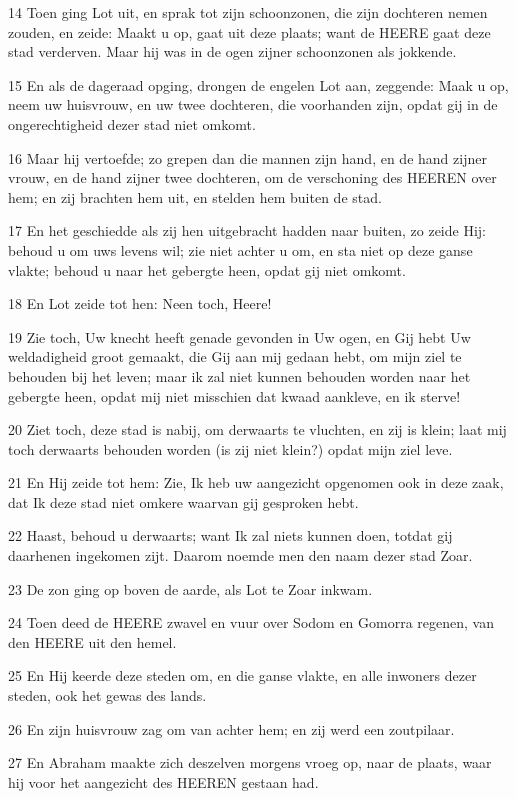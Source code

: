 \par 14 Toen ging Lot uit, en sprak tot zijn schoonzonen, die zijn dochteren nemen zouden, en zeide: Maakt u op, gaat uit deze plaats; want de HEERE gaat deze stad verderven. Maar hij was in de ogen zijner schoonzonen als jokkende.
\par 15 En als de dageraad opging, drongen de engelen Lot aan, zeggende: Maak u op, neem uw huisvrouw, en uw twee dochteren, die voorhanden zijn, opdat gij in de ongerechtigheid dezer stad niet omkomt.
\par 16 Maar hij vertoefde; zo grepen dan die mannen zijn hand, en de hand zijner vrouw, en de hand zijner twee dochteren, om de verschoning des HEEREN over hem; en zij brachten hem uit, en stelden hem buiten de stad.
\par 17 En het geschiedde als zij hen uitgebracht hadden naar buiten, zo zeide Hij: behoud u om uws levens wil; zie niet achter u om, en sta niet op deze ganse vlakte; behoud u naar het gebergte heen, opdat gij niet omkomt.
\par 18 En Lot zeide tot hen: Neen toch, Heere!
\par 19 Zie toch, Uw knecht heeft genade gevonden in Uw ogen, en Gij hebt Uw weldadigheid groot gemaakt, die Gij aan mij gedaan hebt, om mijn ziel te behouden bij het leven; maar ik zal niet kunnen behouden worden naar het gebergte heen, opdat mij niet misschien dat kwaad aankleve, en ik sterve!
\par 20 Ziet toch, deze stad is nabij, om derwaarts te vluchten, en zij is klein; laat mij toch derwaarts behouden worden (is zij niet klein?) opdat mijn ziel leve.
\par 21 En Hij zeide tot hem: Zie, Ik heb uw aangezicht opgenomen ook in deze zaak, dat Ik deze stad niet omkere waarvan gij gesproken hebt.
\par 22 Haast, behoud u derwaarts; want Ik zal niets kunnen doen, totdat gij daarhenen ingekomen zijt. Daarom noemde men den naam dezer stad Zoar.
\par 23 De zon ging op boven de aarde, als Lot te Zoar inkwam.
\par 24 Toen deed de HEERE zwavel en vuur over Sodom en Gomorra regenen, van den HEERE uit den hemel.
\par 25 En Hij keerde deze steden om, en die ganse vlakte, en alle inwoners dezer steden, ook het gewas des lands.
\par 26 En zijn huisvrouw zag om van achter hem; en zij werd een zoutpilaar.
\par 27 En Abraham maakte zich deszelven morgens vroeg op, naar de plaats, waar hij voor het aangezicht des HEEREN gestaan had.
